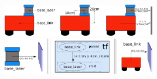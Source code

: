 \includegraphics[width=0.5\textwidth,angle=0]{tutorials/tutorial_2/img/simple_robot.png}
\includegraphics[width=0.5\textwidth,angle=0]{tutorials/tutorial_2/img/tf_robot.png}